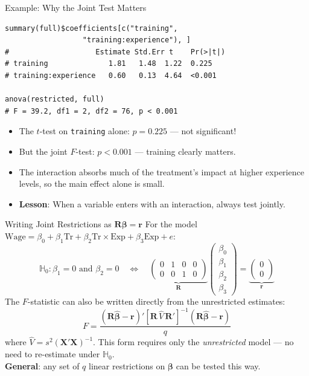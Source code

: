 \documentclass[aspectratio=169, handout, t]{beamer}
\numberwithin{equation}{section}
\begin{document}
\begin{frame}[fragile]{Example: Why the Joint Test Matters}
\begin{lstlisting}[style=Rstyle]
summary(full)$coefficients[c("training",
                  "training:experience"), ]
#                    Estimate Std.Err t    Pr(>|t|)
# training              1.81   1.48  1.22  0.225
# training:experience   0.60   0.13  4.64  <0.001

anova(restricted, full)
# F = 39.2, df1 = 2, df2 = 76, p < 0.001
\end{lstlisting}\pause
\smallskip
\begin{itemize}\setlength{\itemsep}{2pt}
\item The $t$-test on \texttt{training} alone: $p=0.225$ --- \alert{not significant}!\pause
\item But the joint $F$-test: $p<0.001$ --- training clearly matters.\pause
\item The interaction absorbs much of the treatment's impact at higher experience levels, so the main effect alone is small.\pause
\item \textbf{Lesson}: When a variable enters with an interaction, always test jointly.
\end{itemize}
\end{frame}

\begin{frame}{Writing Joint Restrictions as $\bm{R\beta}=\bm{r}$}
For the model $\text{Wage}=\beta_0+\beta_1 \text{Tr}+\beta_2 \text{Tr}\!\times\!\text{Exp}+\beta_3\text{Exp}+e$:\pause
$$\mathbb{H}_0:\beta_1=0\text{ and }\beta_2=0 \quad\Longleftrightarrow\quad \underbrace{\begin{pmatrix}0 & 1 & 0 & 0\\0 & 0 & 1 & 0\end{pmatrix}}_{\bm{R}}\begin{pmatrix}\beta_0\\\beta_1\\\beta_2\\\beta_3\end{pmatrix}=\underbrace{\begin{pmatrix}0\\0\end{pmatrix}}_{\bm{r}}$$\pause
The $F$-statistic can also be written directly from the unrestricted estimates:
$$F=\frac{(\bm{R}\hat{\bm{\beta}}-\bm{r})'[\bm{R}\,\hat{V}\,\bm{R}']^{-1}(\bm{R}\hat{\bm{\beta}}-\bm{r})}{q}$$\pause
where $\hat{V}=s^2(\bm{X'X})^{-1}$. This form requires only the \emph{unrestricted} model --- no need to re-estimate under $\mathbb{H}_0$.\\[4pt]\pause
\textbf{General}: any set of $q$ linear restrictions on $\bm{\beta}$ can be tested this way.
\end{frame}
\end{document}
